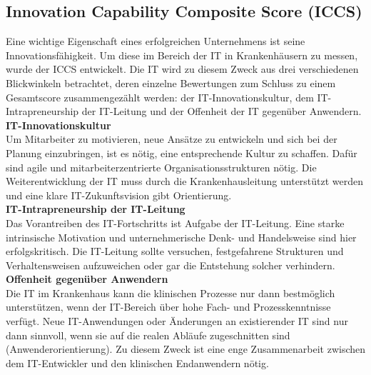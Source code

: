 \subsection{Innovation Capability Composite Score (ICCS)}
	Eine wichtige Eigenschaft eines erfolgreichen Unternehmens ist seine Innovationsfähigkeit. Um diese im Bereich der IT in Krankenhäusern zu messen, wurde der ICCS entwickelt. Die IT wird zu diesem Zweck aus drei verschiedenen Blickwinkeln betrachtet, deren einzelne Bewertungen zum Schluss zu einem Gesamtscore zusammengezählt werden: der IT-Innovationskultur, dem IT-Intrapreneurship der IT-Leitung und der Offenheit der IT gegenüber Anwendern. \parencite{huebner2019}
	\vspace{\parheadvspace}\\
	\textbf{IT-Innovationskultur}\\
	Um Mitarbeiter zu motivieren, neue Ansätze zu entwickeln und sich bei der Planung einzubringen, ist es nötig, eine entsprechende Kultur zu schaffen. Dafür sind agile und mitarbeiterzentrierte Organisationsstrukturen nötig. Die Weiterentwicklung der IT muss durch die Krankenhausleitung unterstützt werden und eine klare IT-Zukunftsvision gibt Orientierung.
	\vspace{\parheadvspace}\\
	\textbf{IT-Intrapreneurship der IT-Leitung}\\
	Das Vorantreiben des IT-Fortschritts ist Aufgabe der IT-Leitung. Eine starke intrinsische Motivation und unternehmerische Denk- und Handelsweise sind hier erfolgskritisch. Die IT-Leitung sollte versuchen, festgefahrene Strukturen und Verhaltensweisen aufzuweichen oder gar die Entstehung solcher verhindern.
	\vspace{\parheadvspace}\\
	\textbf{Offenheit gegenüber Anwendern}\\
	Die IT im Krankenhaus kann die klinischen Prozesse nur dann bestmöglich unterstützen, wenn der IT-Bereich über hohe Fach- und Prozesskenntnisse verfügt. Neue IT-Anwendungen oder Änderungen an existierender IT sind nur dann sinnvoll, wenn sie auf die realen Abläufe zugeschnitten sind (Anwenderorientierung). Zu diesem Zweck ist eine enge Zusammenarbeit zwischen dem IT-Entwickler und den klinischen Endanwendern nötig.
